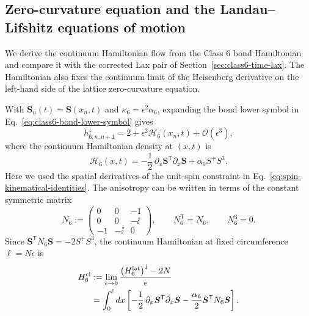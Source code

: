\subsection{Zero-curvature equation and the Landau--Lifshitz equations of motion}
\label{sec:class6-eom}

We derive the continuum Hamiltonian flow from the Class 6 bond Hamiltonian
and compare it with the corrected Lax pair of
Section~\ref{sec:class6-time-lax}.  The Hamiltonian also fixes the
continuum limit of the Heisenberg derivative on the left-hand side of
the lattice zero-curvature equation.

With $\boldsymbol S_n(t)=\boldsymbol S(x_n,t)$ and
$\kappa_6=\epsilon^2\alpha_6$, expanding the bond lower symbol in
Eq.~\eqref{eq:class6-bond-lower-symbol} gives
\begin{equation}
h_{6;n,n+1}^\downarrow
=2+\epsilon^2\mathcal H_6(x_n,t)+\mathcal O(\epsilon^3),
\label{eq:class6-h-lower-expansion}
\end{equation}
where the continuum Hamiltonian density at $(x,t)$ is
\begin{equation}
\mathcal H_6(x,t)
=-\frac12\,\partial_x\boldsymbol S^{\mathsf T}\partial_x\boldsymbol S
+\alpha_6 S^+S^3.
\label{eq:class6-hamiltonian-density}
\end{equation}
Here we used the spatial derivatives of the unit-spin constraint in
Eq.~\eqref{eq:spin-kinematical-identities}.  The anisotropy can be written
in terms of the constant symmetric matrix
\begin{equation}
N_6:=\begin{pmatrix}
0&0&-1\\
0&0&-\ii\\
-1&-\ii&0
\end{pmatrix},
\qquad N_6^{\mathsf T}=N_6,
\qquad N_6^3=0.
\label{eq:class6-N-definition}
\end{equation}
Since $\boldsymbol S^{\mathsf T}N_6\boldsymbol S=-2S^+S^3$, the
continuum Hamiltonian at fixed circumference $\ell=N\epsilon$ is
\begin{align}
H^{\rm cl}_6
&:=\lim_{\epsilon\to0}
\frac{\bigl(H^{\rm lat}_6\bigr)^\downarrow-2N}{\epsilon}
\nonumber\\
&=\int_0^\ell dx\left[
-\frac12\,\partial_x\boldsymbol S^{\mathsf T}\partial_x\boldsymbol S
-\frac{\alpha_6}{2}\boldsymbol S^{\mathsf T}N_6\boldsymbol S
\right].
\label{eq:class6-continuum-hamiltonian}
\end{align}

